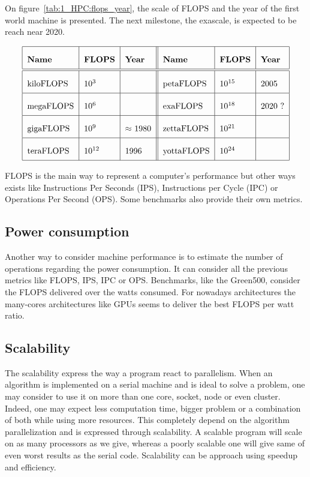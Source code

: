 On figure~\ref{tab:1_HPC:flops_year}, the scale of FLOPS and the year of the first world machine is presented.
The next milestone, the exascale, is expected to be reach near 2020.  

\begin{table}
\[\arraycolsep=1.4pt\def\arraystretch{2.2}
\begin{tabular}{| l | l | l || l | l | l |}
\hline
	\textbf{Name} & \textbf{FLOPS} & \textbf{Year} & \textbf{Name} & \textbf{FLOPS} & \textbf{Year} \\
	\hline
	\hline
	kiloFLOPS & $10^{3}$ & & petaFLOPS  & $10^{15}$ & 2005 \\ 
	\hline
	megaFLOPS & $10^{6}$ & & exaFLOPS   & $10^{18}$ & 2020 ? \\
	\hline
	gigaFLOPS & $10^{9}$ & $\approx$ 1980  & zettaFLOPS & $10^{21}$ & \\
	\hline
	teraFLOPS & $10^{12}$ & 1996 & yottaFLOPS & $10^{24}$ & \\
	\hline
	\end{tabular}
	\]
	\caption{Floating-point Operation per Second and years of reach in HPC.}
	\label{tab:1_HPC:flops_year}
\end{table}

FLOPS is the main way to represent a computer's performance but other ways exists like Instructions Per Seconds (IPS), Instructions per Cycle (IPC) or Operations Per Second (OPS).
Some benchmarks also provide their own metrics. 

\subsection{Power consumption}
Another way to consider machine performance is to estimate the number of operations regarding the power consumption. 
It can consider all the previous metrics like FLOPS, IPS, IPC or OPS. 
Benchmarks, like the Green500, consider the FLOPS delivered over the watts consumed. 
For nowadays architectures the many-cores architectures like GPUs seems to deliver the best FLOPS per watt ratio.

\subsection{Scalability}
The scalability express the way a program react to parallelism. 
When an algorithm is implemented on a serial machine and is ideal to solve a problem, one may consider to use it on more than one core, socket, node or even cluster. 
Indeed, one may expect less computation time, bigger problem or a combination of both while using more resources. 
This completely depend on the algorithm parallelization and is expressed through scalability. 
A scalable program will scale on as many processors as we give, whereas a poorly scalable one will give same of even worst results as the serial code.  
Scalability can be approach using speedup and efficiency.


